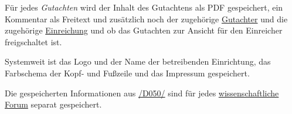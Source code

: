 \begin{description}
	 Für jedes \emph{Gutachten} wird der Inhalt des Gutachtens als PDF gespeichert, ein Kommentar als Freitext und zusätzlich noch der zugehörige \hyperref[funkt:Gutachter]{Gutachter} und die zugehörige \hyperref[d025]{Einreichung} und ob das Gutachten zur Ansicht für den Einreicher freigschaltet ist.

	 Systemweit ist das Logo und der Name der betreibenden Einrichtung, das Farbschema der Kopf- und Fußzeile und das Impressum gespeichert.

	 Die gespeicherten Informationen aus \hyperref[d050]{/D050/} sind für jedes \hyperref[d030]{wissenschaftliche Forum} separat gespeichert.
\end{description}